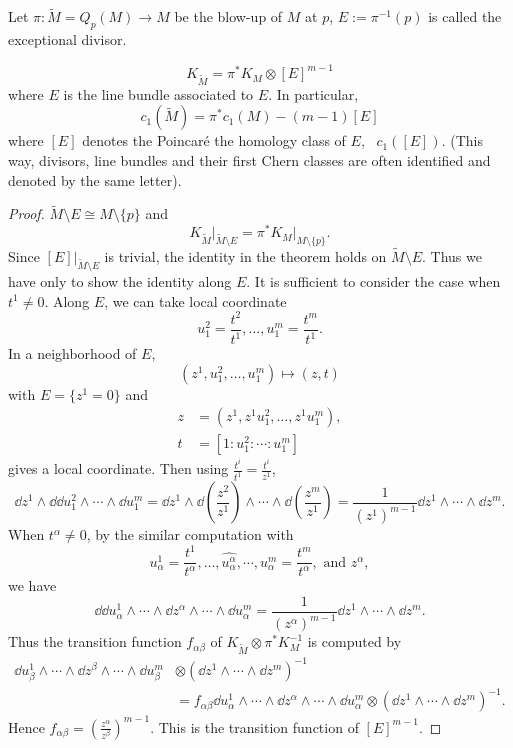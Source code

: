 \documentclass[12pt]{article}
\begin{document}
Let \(\pi:\tilde{M}=Q_p(M)\to M\) be the blow-up of \(M\) at \(p\),
\(E:=\pi^{-1}(p)\) is called the exceptional divisor.
\begin{theorem}
  \[
    K_{\tilde{M}}=\pi^* K_M \otimes [E]^{m-1}
  \] where \(E\) is the line bundle associated to \(E\). In particular, \[
    c_1(\tilde{M})=\pi^* c_1(M)-(m-1)[E]
  \] where \([E]\) denotes the Poincaré the homology class of \(E\),
  \ie\ \(c_1([E])\). (This way, divisors, line bundles and their first Chern
  classes are often identified and denoted by the same letter).
\end{theorem}
\begin{proof}
  \(\tilde{M}\setminus E\cong M\setminus\{p\}\) and \[
    K_{\tilde{M}}\Big|_{\tilde{M}\setminus E}=\pi^* K_M\Big|_{M\setminus\{p\}}
  .\] Since \([E]\big|_{\tilde{M}\setminus E}\) is trivial, the identity in the
  theorem holds on \(\tilde{M}\setminus E\).
  Thus we have only to show the identity along \(E\). It is sufficient to
  consider the case when \(t^1\neq 0\). Along \(E\), we can take local
  coordinate \[
    u_1^2=\frac{t^2}{t^1},\ldots,u_1^m=\frac{t^m}{t^1}
  .\] In a neighborhood of \(E\), \[
    (z^1,u_1^2,\ldots,u_1^m)\longmapsto (z,t)
  \] with \(E=\{z^1=0\}\) and 
  \begin{align*}
    z&=(z^1,z^1 u_1^2,\ldots,z^1 u_1^m), \\
    t&=[1:u_1^2:\cdots :u_1^m]
  \end{align*}
  gives a local coordinate. Then using \(\frac{t^i}{t^1}=\frac{t^i}{z^1}\), \[
    \dd{z^1}\wedge\dd{\dd{u_1^2}}\wedge\cdots\wedge\dd{u_1^m}
    =\dd{z^1}\wedge\dd{(\frac{z^2}{z^1})}\wedge\cdots\wedge\dd{(\frac{z^m}{z^1})}
    =\frac{1}{(z^1)^{m-1}}\dd{z^1}\wedge\cdots\wedge\dd{z^m}
  .\] When \(t^\alpha\neq 0\), by the similar computation with \[
  u_{\alpha}^1=\frac{t^1}{t^\alpha},\ldots,\widehat{u_{\alpha}^\alpha},
  \cdots,u_\alpha^m=\frac{t^m}{t^\alpha},\text{ and }z^\alpha
  ,\] we have \[
    \dd{\dd{u_\alpha^1}}\wedge\cdots\wedge\dd{z^\alpha}\wedge\cdots\wedge
    \dd{u_\alpha^m}=\frac{1}{(z^\alpha)^{m-1}}\dd{z^1}\wedge\cdots\wedge\dd{z^m}
  .\] Thus the transition function \(f_{\alpha\beta}\) of \(K_{\tilde{M}}
  \otimes \pi^*K_M^{-1}\) is computed by
  \begin{align*}
    \dd{u_\beta^1}\wedge\cdots\wedge\dd{z^\beta}\wedge\cdots\wedge
    \dd{u_\beta^m}&\otimes (\dd{z^1}\wedge\cdots\wedge\dd{z^m})^{-1} \\
    &=f_{\alpha\beta}\dd{u_\alpha^1}\wedge\cdots\wedge\dd{z^\alpha}\wedge\cdots
    \wedge\dd{u_\alpha^m}\otimes (\dd{z^1}\wedge\cdots\wedge\dd{z^m})^{-1}
  .\end{align*}
  Hence \(f_{\alpha\beta}=\left(\frac{z^\alpha}{z^\beta}\right)^{m-1}\).
  This is the transition function of \([E]^{m-1}\).


\end{proof}
\end{document}
